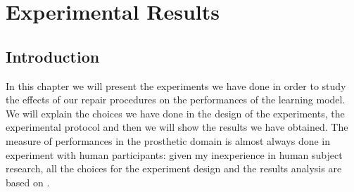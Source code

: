 \chapter{Experimental Results}\label{ch:exp-result}
\section{Introduction}\label{sec:exp-intro}
In this chapter we will present the experiments we have done in order to study the effects of our repair procedures on the performances of the learning model. We will explain the choices we have done in the design of the experiments, the experimental protocol and then we will show the results we have obtained.
The measure of performances in the prosthetic domain is almost always done in experiment with human participants: given my inexperience in human subject research, all the choices for the experiment design and the results analysis are based on \cite{de2017human}.
